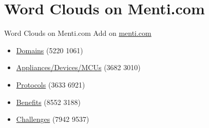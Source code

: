 ﻿\section{Word Clouds on Menti.com}

\begin{frame}{Word Clouds on Menti.com}
Add on \href{menti.com}{menti.com}
\begin{itemize}
    \item \href{https://www.menti.com/ald4gdwf2zrf}{\alert{Domains}} (5220 1061)
    \item \href{https://www.menti.com/alf5bjz2fc13}{\alert{Appliances/Devices/MCUs}} (3682 3010)
    \item \href{https://www.menti.com/alqki1q9dm26}{\alert{Protocols}} (3633 6921)
    \item \href{https://www.menti.com/al1nrxnjq8pc}{\alert{Benefits}} (8552 3188)
    \item \href{https://www.menti.com/alnijmnv6bgy}{\alert{Challenges}} (7942 9537)
\end{itemize}
\end{frame}

